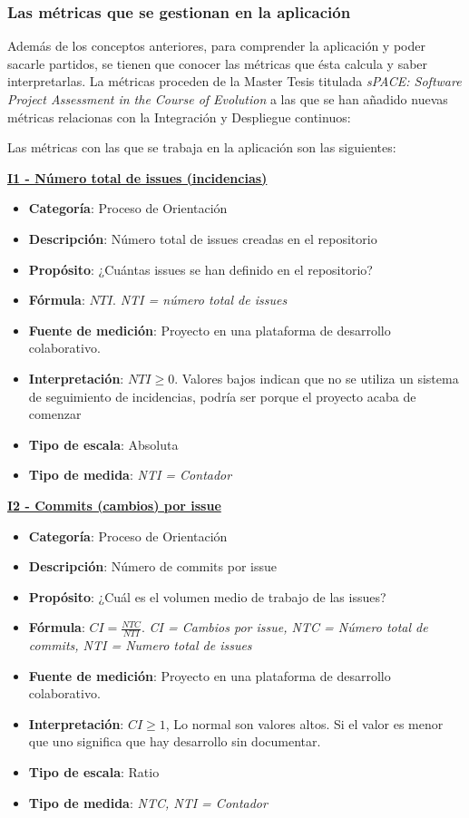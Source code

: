 \subsubsection{Las métricas que se gestionan en la aplicación}

Además de los conceptos anteriores, para comprender la aplicación y poder sacarle partidos, se tienen que conocer las métricas que ésta calcula y saber interpretarlas. La métricas proceden de la Master Tesis titulada \textit{sPACE: Software Project Assessment in the Course of Evolution} \cite{ratzinger_space:_2007} a las que se han añadido nuevas métricas relacionas con la Integración y Despliegue continuos:


Las métricas con las que se trabaja en la aplicación son las siguientes:

\textbf{\underline{I1 - Número total de issues (incidencias)}}

\begin{itemize}
	\item \textbf{Categoría}: Proceso de Orientación
	\item \textbf{Descripción}: Número total de issues creadas en el repositorio
	\item \textbf{Propósito}: ¿Cuántas issues se han definido en el repositorio?
	\item \textbf{Fórmula}: $NTI$. \textit{NTI = número total de issues}
	\item \textbf{Fuente de medición}: Proyecto en una plataforma de desarrollo colaborativo.
	\item \textbf{Interpretación}: $NTI \geq 0$. Valores bajos indican que no se utiliza un sistema de seguimiento de incidencias, podría ser porque el proyecto acaba de comenzar
	\item \textbf{Tipo de escala}: Absoluta
	\item \textbf{Tipo de medida}: \textit{NTI = Contador}
\end{itemize}

\textbf{\underline{I2 - Commits (cambios) por issue}}

\begin{itemize}
	\item \textbf{Categoría}: Proceso de Orientación
	\item \textbf{Descripción}: Número de commits por issue
	\item \textbf{Propósito}: ¿Cuál es el volumen medio de trabajo de las issues?
	\item \textbf{Fórmula}: $CI = \frac{NTC}{NTI}$. \textit{CI = Cambios por issue, NTC = Número total de commits, NTI = Numero total de issues}
	\item \textbf{Fuente de medición}: Proyecto en una plataforma de desarrollo colaborativo.
	\item \textbf{Interpretación}: $CI \geq 1$, Lo normal son valores altos. Si el valor es menor que uno significa que hay desarrollo sin documentar.
	\item \textbf{Tipo de escala}: Ratio 
	\item \textbf{Tipo de medida}: \textit{NTC, NTI = Contador}
\end{itemize}

